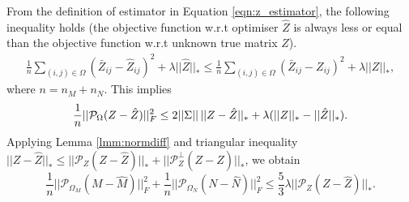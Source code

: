 \documentclass{article} %
\newcommand\mc{\mathcal} %
\begin{document}
From the definition of estimator in Equation \ref{eqn:z_estimator}, the following inequality holds (the objective function  w.r.t optimiser $\hat{Z}$ is always less or equal than the objective function w.r.t unknown true matrix $Z$).
\begin{align}
\frac{1}{n} \sum_{(i,j) \in \Omega}(\bar{Z}_{ij} - \hat{Z}_{ij})^2 + \lambda ||\hat{Z}||_* 
\leq \frac{1}{n} \sum_{(i,j) \in \Omega}(\bar{Z}_{ij} - {Z}_{ij})^2 + \lambda ||{Z}||_*,
\end{align}
where $n = n_M + n_N$. This implies
\begin{equation}
\frac{1}{n}||\mathcal{P}_\Omega(Z - \hat{Z}) ||_F^2 \leq 2||\Sigma||\,||Z - \hat{Z}||_* + \lambda(||Z||_* - ||\hat{Z}||_*). \\
\end{equation}
Applying Lemma \ref{lmm:normdiff} and triangular inequality $||Z - \hat{Z}||_* \leq ||\mc{P}_Z(Z - \hat{Z})||_* + ||\mc{P}_Z^\perp(Z - \hat{Z})||_*$, we obtain
\begin{equation}
\frac{1}{n}||\mc{P}_{\Omega_M}(M-\hat{M})||_F^2 + \frac{1}{n}||\mc{P}_{\Omega_N}(N-\hat{N})||_F^2
\leq \frac{5}{3}\lambda ||\mc{P}_Z(Z-\hat{Z})||_*.
\label{eqn:tri}
\end{equation}
\end{document}
